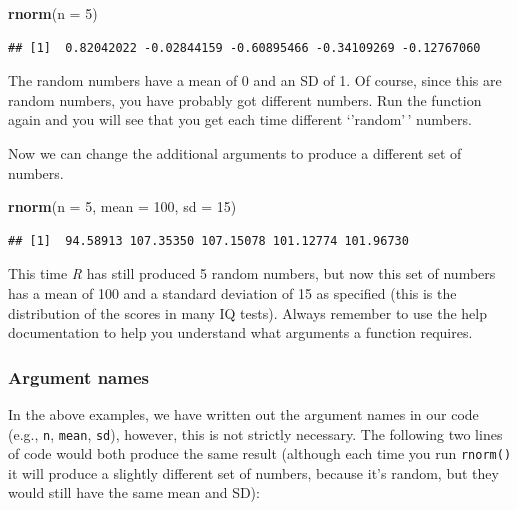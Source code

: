 \documentclass[
]{scrartcl}
\newenvironment{Shaded}{\begin{snugshade}}{\end{snugshade}}
\newcommand{\AttributeTok}[1]{\textcolor[rgb]{0.13,0.29,0.53}{#1}}
\newcommand{\DecValTok}[1]{\textcolor[rgb]{0.00,0.00,0.81}{#1}}
\newcommand{\FunctionTok}[1]{\textcolor[rgb]{0.13,0.29,0.53}{\textbf{#1}}}
\newcommand{\NormalTok}[1]{#1}
\begin{document}
\begin{Shaded}
\begin{Highlighting}[]
\FunctionTok{rnorm}\NormalTok{(}\AttributeTok{n =} \DecValTok{5}\NormalTok{)}
\end{Highlighting}
\end{Shaded}

\begin{verbatim}
## [1]  0.82042022 -0.02844159 -0.60895466 -0.34109269 -0.12767060
\end{verbatim}

The random numbers have a mean of 0 and an SD of 1. Of course, since this are random numbers, you have probably got different numbers. Run the function again and you will see that you get each time different `'random'\,' numbers.

Now we can change the additional arguments to produce a different set of numbers.

\begin{Shaded}
\begin{Highlighting}[]
\FunctionTok{rnorm}\NormalTok{(}\AttributeTok{n =} \DecValTok{5}\NormalTok{, }\AttributeTok{mean =} \DecValTok{100}\NormalTok{, }\AttributeTok{sd =} \DecValTok{15}\NormalTok{)}
\end{Highlighting}
\end{Shaded}

\begin{verbatim}
## [1]  94.58913 107.35350 107.15078 101.12774 101.96730
\end{verbatim}

This time \emph{R} has still produced 5 random numbers, but now this set of numbers has a mean of 100 and a standard deviation of 15 as specified (this is the distribution of the scores in many IQ tests). Always remember to use the help documentation to help you understand what arguments a function requires.

\subsubsection{Argument names}\label{argument-names}

In the above examples, we have written out the argument names in our code (e.g., \texttt{n}, \texttt{mean}, \texttt{sd}), however, this is not strictly necessary. The following two lines of code would both produce the same result (although each time you run \texttt{rnorm()} it will produce a slightly different set of numbers, because it's random, but they would still have the same mean and SD):
\end{document}
